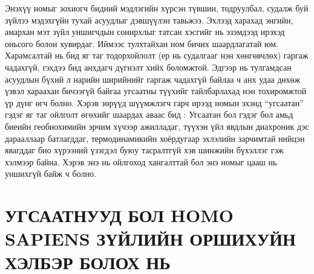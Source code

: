 Энэхүү номыг зохиогч бидний мэдлэгийн хүрсэн түвшин, тодруулбал, судалж буй зүйлээ мэдэхгүйн тухай асуудлыг дэвшүүлэн тавьжээ. Эхлээд харахад энгийн, амархан мэт зүйл уншигчдын сонирхлыг татсан хэсгийг нь эзэмдээд ирэхэд оньсого болон хувирдаг. Иймээс тулхтайхан ном бичих шаардлагатай юм. Харамсалтай нь бид яг таг тодорхойлолт (ер нь судалгааг нэн хөнгөвчлөх) гаргаж чадахгүй, гэхдээ бид анхдагч дүгнэлт хийх боломжтой. Эдгээр нь тулгамдсан асуудлын бүхий л нарийн ширийнийг гаргаж чадахгүй байлаа ч анх удаа дөхөж үзвэл хараахан бичээгүй байгаа угсаатны түүхийг тайлбарлахад нэн тохиромжтой үр дүнг өгч болно. Хэрэв зөрүүд шүүмжлэгч гарч ирээд номын эхэнд “угсаатан” гэдэг яг таг ойлголт өгөхийг шаардах аваас бид : Угсаатан бол гэдэг бол амьд биеийн геобиохимийн эрчим хүчээр ажилладаг, түүхэн үйл явдлын диахроник дэс дарааллаар батлагддаг, термодинамикийн хоёрдугаар эхлэлийн зарчимтай нийцэн явагддаг био хүрээний үзэгдэл буюу тасралтгүй хэв шинжийн бүхэллэг гэж хэлмээр байна. Хэрэв энэ нь ойлгоход хангалттай бол энэ номыг цааш нь уншихгүй байж ч болно.

\section*{УГСААТНУУД БОЛ HOMO SAPIENS ЗҮЙЛИЙН ОРШИХУЙН ХЭЛБЭР БОЛОХ НЬ}

